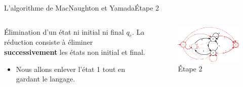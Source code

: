 \documentclass{beamer}
\begin{document}
\begin{frame}{L'algorithme de MacNaughton et Yamada}{Étape 2}
     \begin{columns}[T]
     \begin{column}{.48\textwidth}
         {\fontsize{8}{9}\selectfont Élimination d’un état ni initial ni final \textit{$q_e$}.}
         {\fontsize{8}{9}\selectfont La réduction consiste à éliminer \textbf{successivement} les états non initial et final.}
         \begin{itemize}
         
             \item {\fontsize{7}{8}\selectfont Nous allons enlever l'état 1 tout en gardant le langage.}
         \end{itemize}
     \end{column}
     
     \begin{column}{.48\textwidth}
     \begin{figure}
     \includegraphics[scale=0.37]{Diagramme3_1.jpg}
     \centering
     \caption{Étape 2}     
     \end{figure}
     \end{column}
        
     \end{columns}   

\end{frame}
\end{document}
